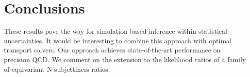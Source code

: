 \section{Conclusions}\label{sec:conclusions}

These results pave the way for simulation-based inference within
statistical uncertainties. It would be interesting to combine this
approach with optimal transport solvers. Our approach achieves
state-of-the-art performance on precision QCD. We comment on the
extension to the likelihood ratios of a family of equivariant
N-subjettiness ratios.

